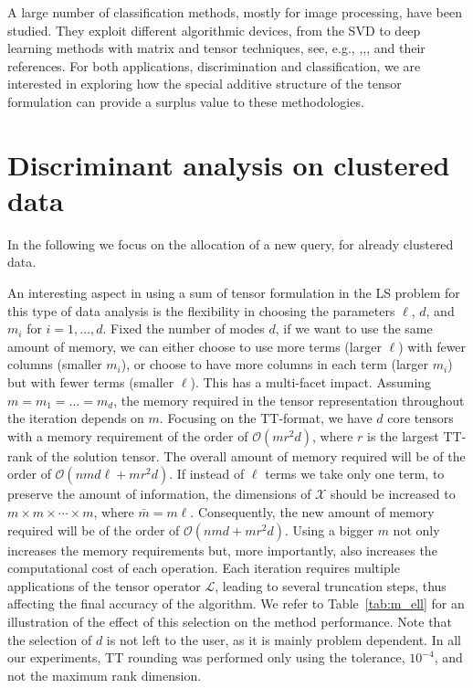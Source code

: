 \documentclass{siamart190516}
\newcommand{\cc}[1]{\mathcal{#1}}
\newcommand{\cX}{\cc X}
\begin{document}
A large number of classification methods, mostly for image processing,  have been studied. They exploit
different algorithmic devices, from the SVD to deep learning methods with
matrix and tensor techniques, see, e.g., \cite{Bouseeetal.17},\cite{Brandoni.Simoncini.20},\cite{doi:10.1137/110842570},\cite{Saputraetal.24} and
their references.
%
For both applications, discrimination and classification, 
 we are interested in exploring how the special additive structure of the
 tensor formulation can provide a surplus value to these methodologies. 


\section{Discriminant analysis on clustered data}\label{sec:discr_expes}
In the following we focus on the allocation
of a new query, for already clustered data. 

An interesting aspect in using a sum of tensor formulation in the LS problem
for this type of data
analysis is the flexibility in
choosing the parameters $\ell$, $d$, and $m_i$ for $i=1,\ldots,d$. Fixed the number of modes $d$, if we want to use the same amount of memory, we can either choose to use more terms (larger $\ell$) with fewer columns (smaller $m_i$), or choose to have more columns in each term (larger $m_i$) but with fewer terms (smaller $\ell$). 
This has a multi-facet impact.
Assuming $m=m_1=\ldots=m_d$, the memory required in the tensor representation throughout the iteration depends on $m$. Focusing on the TT-format, we have $d$ core tensors with a memory requirement of the order of $\cc{O}(mr^2d)$, where $r$ is the largest TT-rank of the solution tensor. The overall amount of memory required will be of the order of $\cc{O}(n m d \ell + m r^2 d)$. If instead of $\ell$ terms we take only one term, to preserve the amount of information, the dimensions of $\cX$ should be increased to ${m} \times {m} \times \cdots \times {m}$, where $\bar{m}= m \ell$. Consequently, the new amount of memory required will be of the order of $\cc{O}(n {m} d + {m} r^2 d)$.
Using a bigger $m$ not only increases the memory requirements but, more importantly, also increases the computational cost of each operation. Each iteration requires multiple applications of the tensor operator $\cc{L}$, leading to several truncation steps, thus affecting the
final accuracy of the algorithm.
We refer to
Table~\ref{tab:m_ell} for an illustration of 
the effect of this selection on the method
performance.
Note that the selection of $d$ is not
left to the user, as it is mainly
problem dependent.
In all our experiments, TT rounding
was performed only using the tolerance, $10^{-4}$, and not the maximum rank dimension.
\end{document}

